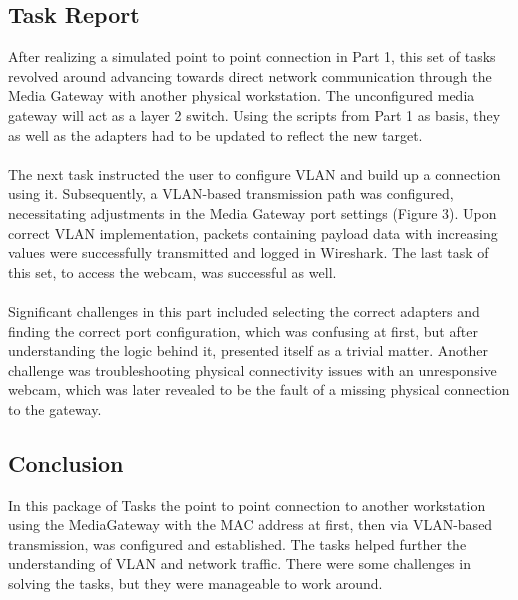 \subsection{Task Report}
After realizing a simulated point to point connection in Part 1, this set of tasks revolved around advancing towards direct network communication through the Media Gateway with another physical workstation. The unconfigured media gateway will act as a layer 2 switch. Using the scripts from Part 1 as basis, they as well as the adapters had to be updated to reflect the new target.\\\\
The next task instructed the user to configure VLAN and build up a connection using it. Subsequently, a VLAN-based transmission path was configured, necessitating adjustments in the Media Gateway port settings (Figure 3). Upon correct VLAN implementation, packets containing payload data with increasing values were successfully transmitted and logged in Wireshark. The last task of this set, to access the webcam, was successful as well.\\\\
Significant challenges in this part included selecting the correct adapters and finding the correct port configuration, which was confusing at first, but after understanding the logic behind it, presented itself as a trivial matter. Another challenge was troubleshooting physical connectivity issues with an unresponsive webcam, which was later revealed to be the fault of a missing physical connection to the gateway.

\subsection{Conclusion}
In this package of Tasks the point to point connection to another workstation using the MediaGateway with the MAC address at first, then via VLAN-based transmission, was configured and established. The tasks helped further the understanding of VLAN and network traffic. There were some challenges in solving the tasks, but they were manageable to work around. 






